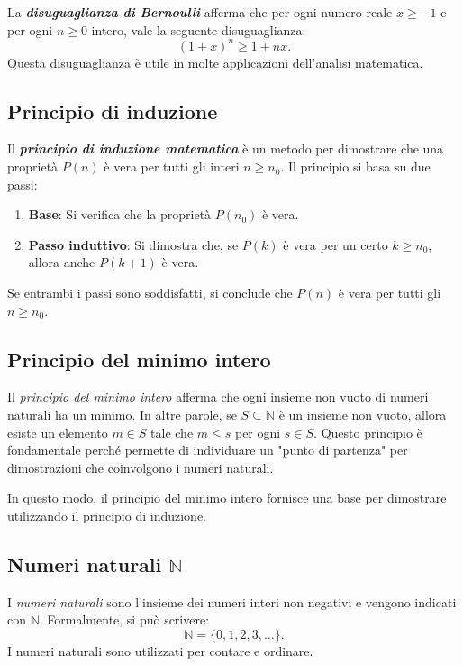 \documentclass[a4paper,12pt]{article}
\begin{document}
La \textbf{\emph{disuguaglianza di Bernoulli}} afferma che per ogni numero reale \( x \geq -1 \) e per ogni \( n \geq 0 \) intero, vale la seguente disuguaglianza:
\[
	(1 + x)^n \geq 1 + nx.
\]
Questa disuguaglianza è utile in molte applicazioni dell'analisi matematica.

\subsection{Principio di induzione}

Il \textbf{\emph{principio di induzione matematica}} è un metodo per dimostrare che una proprietà \( P(n) \) è vera per tutti gli interi \( n \geq n_0 \). Il principio si basa su due passi:
\begin{enumerate}
	\item \textbf{Base}: Si verifica che la proprietà \( P(n_0) \) è vera.
	\item \textbf{Passo induttivo}: Si dimostra che, se \( P(k) \) è vera per un certo \( k \geq n_0 \), allora anche \( P(k+1) \) è vera.
\end{enumerate}

Se entrambi i passi sono soddisfatti, si conclude che \( P(n) \) è vera per tutti gli \( n \geq n_0 \).

\subsection{Principio del minimo intero}
Il \emph{principio del minimo intero} afferma che ogni insieme non vuoto di numeri naturali ha un minimo. In altre parole, se \( S \subseteq \mathbb{N} \) è un insieme non vuoto, allora esiste un elemento \( m \in S \) tale che \( m \leq s \) per ogni \( s \in S \). Questo principio è fondamentale perché permette di individuare un "punto di partenza" per dimostrazioni che coinvolgono i numeri naturali.

In questo modo, il principio del minimo intero fornisce una base per dimostrare utilizzando il principio di induzione.

\subsection{Numeri naturali \(\mathbb{N}\)}
I \emph{numeri naturali} sono l'insieme dei numeri interi non negativi e vengono indicati con \( \mathbb{N} \). Formalmente, si può scrivere:
\[
	\mathbb{N} = \{0, 1, 2, 3, \ldots\}.
\]
I numeri naturali sono utilizzati per contare e ordinare.
\end{document}
